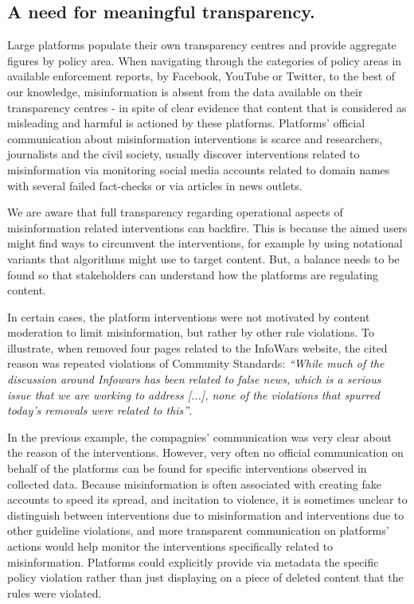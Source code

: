 \documentclass[Afour,sageh,times]{sagej}
\begin{document}
\subsection{A need for meaningful transparency.} 
Large platforms populate their own transparency centres and provide aggregate figures by policy area. When navigating through the categories of policy areas in available enforcement reports, by Facebook, YouTube or Twitter, to the best of our knowledge, misinformation is absent from the data available on their transparency centres - in spite of clear evidence that content that is considered as misleading and harmful is actioned by these platforms.  
Platforms' official communication about misinformation interventions is scarce and researchers, journalists and the civil society, usually discover interventions related to misinformation via monitoring social media accounts related to domain names with several failed fact-checks or via articles in news outlets. 

We are aware that full transparency regarding operational aspects of misinformation related interventions can backfire.
This is because the aimed users might find ways to circumvent the interventions, for example by using notational variants that algorithms might use to target content. 
But, a balance needs to be found so that stakeholders can understand how the platforms are regulating content. 

In certain cases, the platform interventions were not motivated by content moderation to limit misinformation, but rather by other rule violations. To illustrate, when \cite{facebookinfowars} removed four pages related to the InfoWars website, the cited reason was repeated violations of Community Standards: 
{\it ``While much of the discussion around Infowars has been related to false news, which is a serious issue that we are working to address [...], none of the violations that spurred today’s removals were related to this''}.

In the previous example, the compagnies' communication was very clear about the reason of the interventions. 
However, very often no official communication on behalf of the platforms can be found for specific interventions observed in collected data. 
Because misinformation is often associated with creating fake accounts to speed its spread, and incitation to violence, it is sometimes unclear to distinguish between interventions due to misinformation and interventions due to other guideline violations, and more transparent communication on platforms' actions would help monitor the interventions specifically related to misinformation. Platforms could explicitly provide via metadata the specific policy violation rather than just displaying on a piece of deleted content that the rules were violated.
\end{document}
